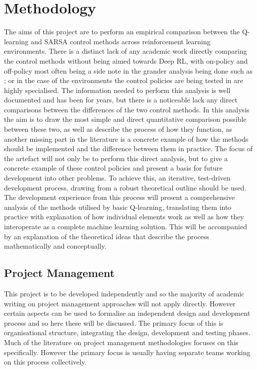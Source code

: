 \documentclass[hidelinks,journal]{IEEEtran}
\begin{document}
\section{Methodology}
\label{sec:methodology}
The aims of this project are to perform an empirical comparison between the Q-learning and SARSA control methods across reinforcement learning environments. There is a distinct lack of any academic work directly comparing the control methods without being aimed towards Deep RL, with on-policy and off-policy most often being a side note in the grander analysis being done such as \textcite{Nagendra18}; or in the case of \textcite{Corozza15} the environments the control policies are being tested in are highly specialised. The information needed to perform this analysis is well documented and has been for years, but there is a noticeable lack any direct comparisons between the differences of the two control methods. In this analysis the aim is to draw the most simple and direct quantitative comparison possible between these two, as well as describe the process of how they function, as another missing part in the literature is a concrete example of how the methods should be implemented and the difference between them in practice. The focus of the artefact will not only be to perform this direct analysis, but to give a concrete example of these control policies and present a basis for future development into other problems. To achieve this, an iterative, test-driven development process, drawing from a robust theoretical outline should be used.  The development experience from this process will present a comprehensive analysis of the methods utilised by basic Q-learning, translating them into practice with explanation of how individual elements work as well as how they interoperate as a complete machine learning solution. This will be accompanied by an explanation of the theoretical ideas that describe the process mathematically and conceptually.
\subsection{Project Management}
\label{subsec:mthdProjMan}
This project is to be developed independently and so the majority of academic writing on project management approaches will not apply directly. However certain aspects can be used to formalise an independent design and development process and so here these will be discussed. The primary focus of this is organisational structure, integrating the design, development and testing phases. Much of the literature on project management methodologies focuses on this specifically. However the primary focus is usually having separate teams working on this process collectively.
\end{document}
